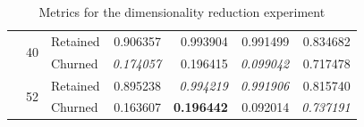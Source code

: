 \documentclass{kththesis}
\begin{document}
\begin{table}
\begin{tabular}{lllrrrr}
\cline{2-7}
     & \multirow{2}{*}{40} & Retained &  0.906357 &  0.993904 &   0.991499 &  0.834682 \\
     &   & Churned &  \textit{0.174057} &  0.196415 &   \textit{0.099042} &  0.717478 \\
\cline{2-7}
     & \multirow{2}{*}{52} & Retained &  0.895238 &  \textit{0.994219} &   \textit{0.991906} &  0.815740 \\
     &   & Churned &  0.163607 &  \textbf{0.196442} &   0.092014 &  \textit{0.737191} \\
\bottomrule
\end{tabular}
\caption{Metrics for the dimensionality reduction experiment}
\label{tab:dim_reduction}
\end{table}

\todos
\end{document}
